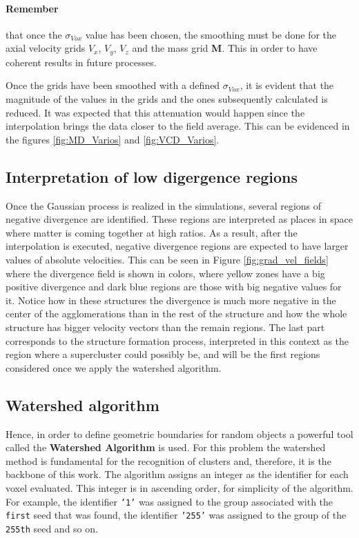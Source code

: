 \documentclass[usenatbib]{mnras}
\begin{document}
\paragraph{Remember}  that once the $\sigma_{Vox}$ value has been chosen, the smoothing must be done for the axial velocity grids $V_x$, $V_y$, $V_z$ and the mass grid \textbf{M}. This in order to have coherent results in future processes.




Once the grids have been smoothed with a defined $\sigma_{Vox}$, it is evident that the magnitude of the values in the grids and the ones subsequently calculated is reduced. It was expected that this attenuation would happen since the interpolation brings the data closer to the field average. This can be evidenced in the figures \ref{fig:MD_Varios} and \ref{fig:VCD_Varios}.

\subsection{Interpretation of low digergence regions}
Once the Gaussian process is realized in the simulations, several regions of negative divergence are identified. These regions are interpreted as places in space where matter is coming together at high ratios. As a result, after the interpolation is executed, negative divergence regions are expected to have larger values of absolute velocities. This can be seen in Figure \ref{fig:grad_vel_fields} where the divergence field is shown in colors, where yellow zones have a big positive divergence and dark blue regions are those with big negative values for it. Notice how in these structures the divergence is much more negative in the center of the agglomerations than in the rest of the structure and how the whole structure has bigger velocity vectors than the remain regions. The last part corresponds to the structure formation process, interpreted in this context as the region where a supercluster could possibly be, and will be the first regions considered once we apply the watershed algorithm.


\subsection{Watershed algorithm}
 Hence, in order to define geometric boundaries for random objects a powerful tool called  the \textbf{Watershed Algorithm} is used. For this problem the watershed method is fundamental for the recognition of clusters and, therefore, it is the backbone of this work. The algorithm assigns an integer as the identifier for each voxel evaluated. This integer is in ascending order, for simplicity of the algorithm. For example, the identifier \texttt{'1'} was assigned to the group associated with the \texttt{first} seed that was found, the identifier \texttt{'255'} was assigned to the group of the \texttt{255th} seed and so on. 
 
\end{document}
